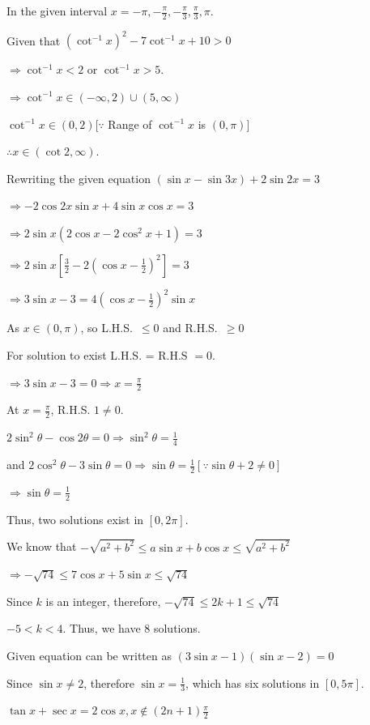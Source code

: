   In the given interval $x = -\pi, -\frac{\pi}{2}, -\frac{\pi}{3}, \frac{\pi}{3}, \pi$.
\item Given that $\left(\cot^{-1}x\right)^2 - 7\cot^{-1}x + 10 > 0$

  $\Rightarrow \cot^{-1}x < 2$ or $\cot^{-1}x > 5$.

  $\Rightarrow \cot^{-1}x\in(-\infty, 2)\cup (5, \infty)$

  $\cot^{-1}x\in(0, 2)$[$\because$ Range of $\cot^{-1}x$ is $(0, \pi)$]

  $\therefore x\in(\cot 2, \infty)$.
\item Rewriting the given equation $(\sin x - \sin3x) + 2\sin2x = 3$

  $\Rightarrow -2\cos2x\sin x + 4\sin x\cos x = 3$

  $\Rightarrow 2\sin x(2\cos x - 2\cos^2x + 1) = 3$

  $\Rightarrow 2\sin x\left[\frac{3}{2} - 2\left(\cos x - \frac{1}{2}\right)^2\right] = 3$

  $\Rightarrow 3\sin x - 3 = 4\left(\cos x - \frac{1}{2}\right)^2\sin x$

  As $x \in(0, \pi)$, so L.H.S.\ $\le 0$ and R.H.S.\ $\ge 0$

  For solution to exist L.H.S. = R.H.S $= 0$.

  $\Rightarrow 3\sin x - 3 = 0\Rightarrow x = \frac{\pi}{2}$

  At $x = \frac{\pi}{2}$, R.H.S. $1\ne 0$.
\item $2\sin^2\theta - \cos2\theta = 0\Rightarrow \sin^2\theta = \frac{1}{4}$

  and $2\cos^2\theta - 3\sin\theta = 0 \Rightarrow \sin\theta = \frac{1}{2}[\because \sin\theta + 2 \ne 0]$

  $\Rightarrow \sin\theta = \frac{1}{2}$

  Thus, two solutions exist in $[0, 2\pi]$.
\item We know that $-\sqrt{a^2 + b^2}\leq a\sin x + b\cos x\le \sqrt{a^2 + b^2}$

  $\Rightarrow -\sqrt{74}\le 7\cos x + 5\sin x\le \sqrt{74}$

  Since $k$ is an integer, therefore, $-\sqrt{74}\le 2k + 1\le \sqrt{74}$

  $-5< k < 4$. Thus, we have $8$ solutions.
\item Given equation can be written as $(3\sin x - 1)(\sin x - 2) = 0$

  Since $\sin x\ne 2$, therefore $\sin x = \frac{1}{3}$, which has six solutions in $[0, 5\pi]$.
\item $\tan x + \sec x = 2\cos x, x\not\in(2n + 1)\frac{\pi}{2}$

